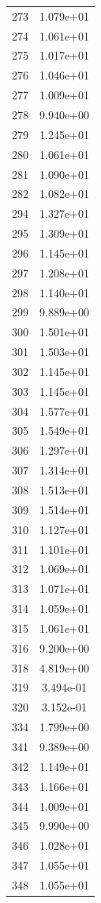 \documentclass[12pt]{article}
\begin{document}
\begin{longtable}{@{}cc@{}}
273 & 1.079e+01 \\
274 & 1.061e+01 \\
275 & 1.017e+01 \\
276 & 1.046e+01 \\
277 & 1.009e+01 \\
278 & 9.940e+00 \\
279 & 1.245e+01 \\
280 & 1.061e+01 \\
281 & 1.090e+01 \\
282 & 1.082e+01 \\
294 & 1.327e+01 \\
295 & 1.309e+01 \\
296 & 1.145e+01 \\
297 & 1.208e+01 \\
298 & 1.140e+01 \\
299 & 9.889e+00 \\
300 & 1.501e+01 \\
301 & 1.503e+01 \\
302 & 1.145e+01 \\
303 & 1.145e+01 \\
304 & 1.577e+01 \\
305 & 1.549e+01 \\
306 & 1.297e+01 \\
307 & 1.314e+01 \\
308 & 1.513e+01 \\
309 & 1.514e+01 \\
310 & 1.127e+01 \\
311 & 1.101e+01 \\
312 & 1.069e+01 \\
313 & 1.071e+01 \\
314 & 1.059e+01 \\
315 & 1.061e+01 \\
316 & 9.200e+00 \\
318 & 4.819e+00 \\
319 & 3.494e-01 \\
320 & 3.152e-01 \\
334 & 1.799e+00 \\
341 & 9.389e+00 \\
342 & 1.149e+01 \\
343 & 1.166e+01 \\
344 & 1.009e+01 \\
345 & 9.990e+00 \\
346 & 1.028e+01 \\
347 & 1.055e+01 \\
348 & 1.055e+01 \\

\end{longtable}
\end{document}
